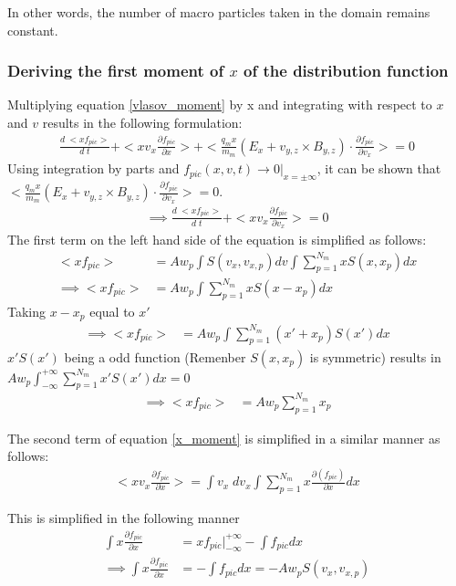 \documentclass{article}
\begin{document}
In other words, the number of macro particles taken in the domain remains constant.
\subsubsection*{Deriving the first moment of $x$ of the distribution function}
Multiplying equation \ref{vlasov_moment} by x and integrating with respect to $x$ and $v$ results in the following formulation:
\begin{align}
\frac{d\;<xf_{pic}>}{d\;t} + <xv_{x} \frac{\partial f_{pic}}{\partial x}> + <\frac{q_{m}x}{m_{m}}(E_{x} + v_{y,z} \times B_{y,z})\cdot \frac{\partial f_{pic}}{\partial v_{x}}> = 0
\end{align}
Using integration by parts and $f_{pic}(x,v,t)\rightarrow 0\rvert_{x = \pm \infty}$, it can be shown that $<\frac{q_{m}x}{m_{m}}(E_{x} + v_{y,z} \times B_{y,z})\cdot \frac{\partial f_{pic}}{\partial v_{x}}> = 0$.
\begin{align}
\implies \frac{d\;<xf_{pic}>}{d\;t} + <xv_{x}\frac{\partial f_{pic}}{\partial v_{x}}> = 0 \label{x_moment} 
\end{align}
The first term on the left hand side of the equation is simplified as follows:
\begin{align}
<xf_{pic}> &= Aw_{p}\int S(v_{x},v_{x,p})  dv \int \sum_{p=1}^{N_{m}}xS(x, x_{p}) dx \\
\implies <xf_{pic}> &= Aw_{p} \int \sum_{p=1}^{N_{m}}xS(x - x_{p}) dx
\end{align}
Taking $x-x_{p}$ equal to $x'$ 
\begin{align}
\implies <xf_{pic}> &= Aw_{p} \int \sum_{p=1}^{N_{m}}(x' + x_{p})S(x') dx
\end{align}
$x'S(x')$ being a odd function (Remenber $S(x,x_{p})$ is symmetric) results in $Aw_{p} \int_{-\infty}^{+\infty} \sum_{p=1}^{N_{m}}x'S(x') dx = 0$
\begin{align}
\implies <xf_{pic}> &= Aw_{p} \sum_{p=1}^{N_{m}}x_{p} \label{x_res1}
\end{align}

The second term of equation \ref{x_moment} is simplified in a similar manner as follows:
\begin{align}
<xv_{x}\frac{\partial f_{pic}}{\partial x}>  = \int v_{x}\;dv_{x} \int \sum_{p=1}^{N_{m}} x\frac{\partial (f_{pic})}{\partial x}dx \label{x_mom1}
\end{align}

This is simplified in the following manner
\begin{align}
\int x \frac{\partial f_{pic}}{\partial x} &= xf_{pic}\rvert_{-\infty}^{+\infty} - \int f_{pic} dx \\
\implies \int x \frac{\partial f_{pic}}{\partial x} &= - \int f_{pic} dx = -Aw_{p}S(v_{x},v_{x,p})
\end{align}
\end{document}
